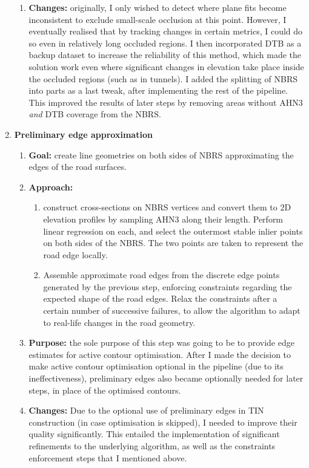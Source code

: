 \begin{enumerate}
\begin{enumerate}
        \item \textbf{Changes:} originally, I only wished to detect where plane fits become inconsistent to exclude small-scale occlusion at this point. However, I eventually realised that by tracking changes in certain metrics, I could do so even in relatively long occluded regions. I then incorporated DTB as a backup dataset to increase the reliability of this method, which made the solution work even where significant changes in elevation take place inside the occluded regions (such as in tunnels). I added the splitting of NBRS into parts as a last tweak, after implementing the rest of the pipeline. This improved the results of later steps by removing areas without AHN3 \textit{and} DTB coverage from the NBRS.
    \end{enumerate}
    \item \textbf{Preliminary edge approximation}
    \begin{enumerate}
        \item \textbf{Goal:} create line geometries on both sides of NBRS approximating the edges of the road surfaces.
        \item \textbf{Approach:}
        \begin{enumerate}
            \item construct cross-sections on NBRS vertices and convert them to 2D elevation profiles by sampling AHN3 along their length. Perform linear regression on each, and select the outermost stable inlier points on both sides of the NBRS. The two points are taken to represent the road edge locally.
            \item Assemble approximate road edges from the discrete edge points generated by the previous step, enforcing constraints regarding the expected shape of the road edges. Relax the constraints after a certain number of successive failures, to allow the algorithm to adapt to real-life changes in the road geometry.
        \end{enumerate}
        \item \textbf{Purpose:} the sole purpose of this step was going to be to provide edge estimates for active contour optimisation. After I made the decision to make active contour optimisation optional in the pipeline (due to its ineffectiveness), preliminary edges also became optionally needed for later steps, in place of the optimised contours.
        \item \textbf{Changes:} Due to the optional use of preliminary edges in TIN construction (in case optimisation is skipped), I needed to improve their quality significantly. This entailed the implementation of significant refinements to the underlying algorithm, as well as the constraints enforcement steps that I mentioned above.

\end{enumerate}
\end{enumerate}
